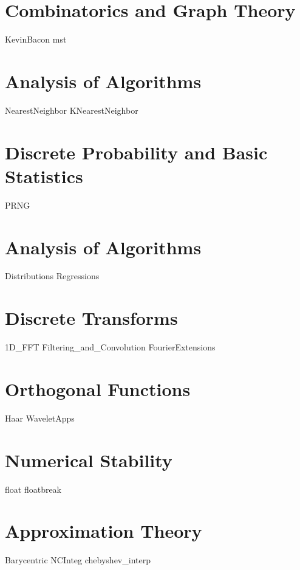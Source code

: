 \documentclass[nociteref]{SIAM-GH-book}
\begin{document}
\part{Combinatorics and Graph Theory}
{KevinBacon}
{mst}

\part{Analysis of Algorithms}
{NearestNeighbor}
{KNearestNeighbor}

\part{Discrete Probability and Basic Statistics}
{PRNG}


\part{Analysis of Algorithms}
{Distributions}
{Regressions}

\part{Discrete Transforms}
{1D_FFT}
{Filtering_and_Convolution}
{FourierExtensions}

\part{Orthogonal Functions}
{Haar}
{WaveletApps}

\part{Numerical Stability}
{float}
{floatbreak}

\part{Approximation Theory}
{Barycentric}
{NCInteg}
{chebyshev_interp}
\end{document}
